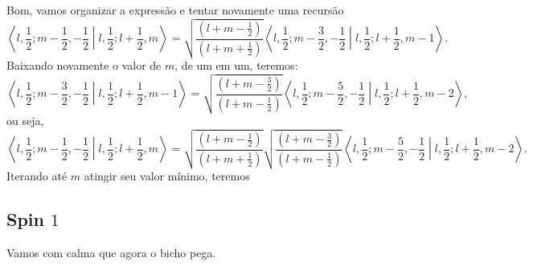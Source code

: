 \documentclass{article}
\newcommand{\abraket}[2]{\left\langle #1 \middle| #2 \right\rangle}
\begin{document}
Bom, vamos organizar a expressão e tentar novamente uma recursão
\begin{equation}
 \abraket{l,\frac{1}{2};m - \frac{1}{2},-\frac{1}{2}}{l,\frac{1}{2};l + \frac{1}{2},m} =
 \sqrt{\frac{\left(l + m - \frac{1}{2}\right)}{\left(l + m + \frac{1}{2}\right)}}
 \abraket{l,\frac{1}{2};m - \frac{3}{2},-\frac{1}{2}}{l,\frac{1}{2};l + \frac{1}{2},m - 1}\mathrm{.}
\end{equation}
Baixando novamente o valor de $m$, de um em um, teremos:
\begin{equation}
 \abraket{l,\frac{1}{2};m - \frac{3}{2},-\frac{1}{2}}{l,\frac{1}{2};l + \frac{1}{2},m-1} =
 \sqrt{\frac{\left(l + m - \frac{3}{2}\right)}{\left(l + m - \frac{1}{2}\right)}}
 \abraket{l,\frac{1}{2};m - \frac{5}{2},-\frac{1}{2}}{l,\frac{1}{2};l + \frac{1}{2},m - 2}\mathrm{,}
\end{equation}
ou seja,
\begin{equation}
 \abraket{l,\frac{1}{2};m - \frac{1}{2},-\frac{1}{2}}{l,\frac{1}{2};l + \frac{1}{2},m} =
 \sqrt{\frac{\left(l + m - \frac{1}{2}\right)}{\left(l + m + \frac{1}{2}\right)}}
 \sqrt{\frac{\left(l + m - \frac{3}{2}\right)}{\left(l + m - \frac{1}{2}\right)}}
 \abraket{l,\frac{1}{2};m - \frac{5}{2},-\frac{1}{2}}{l,\frac{1}{2};l + \frac{1}{2},m - 2}\mathrm{.}
\end{equation}
Iterando até $m$ atingir seu valor mínimo, teremos
\subsection{Spin $1$}
Vamos com calma que agora o bicho pega.
\end{document}
